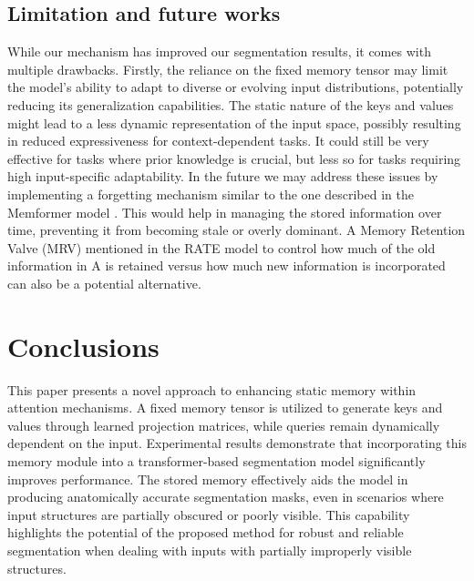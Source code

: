 \documentclass[preprint,12pt]{elsarticle}
\begin{document}

\subsection{Limitation and future works}
While our mechanism has improved our segmentation results, it comes with multiple drawbacks.
Firstly, the reliance on the fixed memory tensor may limit the model's ability to adapt to diverse or evolving input distributions, potentially reducing its generalization capabilities. The static nature of the keys and values might lead to a less dynamic representation of the input space, possibly resulting in reduced expressiveness for context-dependent tasks. It could still be very effective for tasks where prior knowledge is crucial, but less so for tasks requiring high input-specific adaptability.
In the future we may address these issues by implementing a forgetting mechanism similar to the one described in the Memformer model \cite{memformer}. This would help in managing the stored information over time, preventing it from becoming stale or overly dominant. A Memory Retention Valve (MRV) mentioned in the RATE model \cite{rate} to control how much of the old information in A is retained versus how much new information is incorporated can also be a potential alternative.


\section{Conclusions} \label{con}
This paper presents a novel approach to enhancing static memory within attention mechanisms. A fixed memory tensor is utilized to generate keys and values through learned projection matrices, while queries remain dynamically dependent on the input. Experimental results demonstrate that incorporating this memory module into a transformer-based segmentation model significantly improves performance. The stored memory effectively aids the model in producing anatomically accurate segmentation masks, even in scenarios where input structures are partially obscured or poorly visible. This capability highlights the potential of the proposed method for robust and reliable segmentation when dealing with inputs with partially improperly visible structures.
\end{document}
